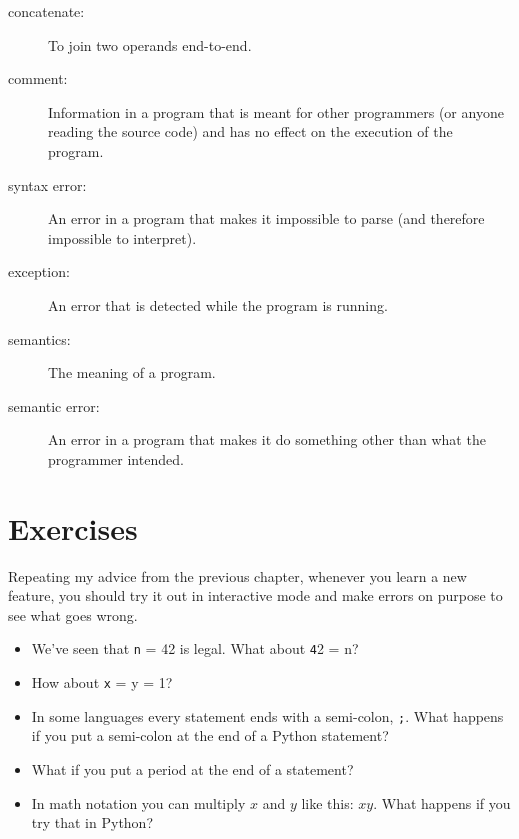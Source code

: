 \documentclass[
DIV=11,
fontsize=13,
twoside,
headinclude=false,
titlepage=firstiscover,
abstract=true,
headsepline=true,
footsepline=true,
chapterprefix=true, %
headings=big,
bibliography=totoc,%
captions=tableheading
]{scrbook}
\theoremstyle{definition}
\begin{document}
\begin{description}
\item[concatenate:]  To join two operands end-to-end.

\item[comment:]  Information in a program that is meant for other
programmers (or anyone reading the source code) and has no effect on the
execution of the program.

\item[syntax error:]  An error in a program that makes it impossible
to parse (and therefore impossible to interpret).

\item[exception:]  An error that is detected while the program is running.

\item[semantics:]  The meaning of a program.

\item[semantic error:]   An error in a program that makes it do something
other than what the programmer intended.

\end{description}


\section{Exercises}

\begin{exercise}
\normalfont

Repeating my advice from the previous chapter, whenever you learn
a new feature, you should try it out in interactive mode and make
errors on purpose to see what goes wrong.

\begin{itemize}

\item We've seen that {\texttt n = 42} is legal.  What about {\texttt 42 = n}?

\item How about {\texttt x = y = 1}?

\item In some languages every statement ends with a semi-colon, {\texttt ;}.
What happens if you put a semi-colon at the end of a Python statement?

\item What if you put a period at the end of a statement?

\item In math notation you can multiply $x$ and $y$ like this: $x y$.
What happens if you try that in Python?

\end{itemize}

\end{exercise}
\end{document}
